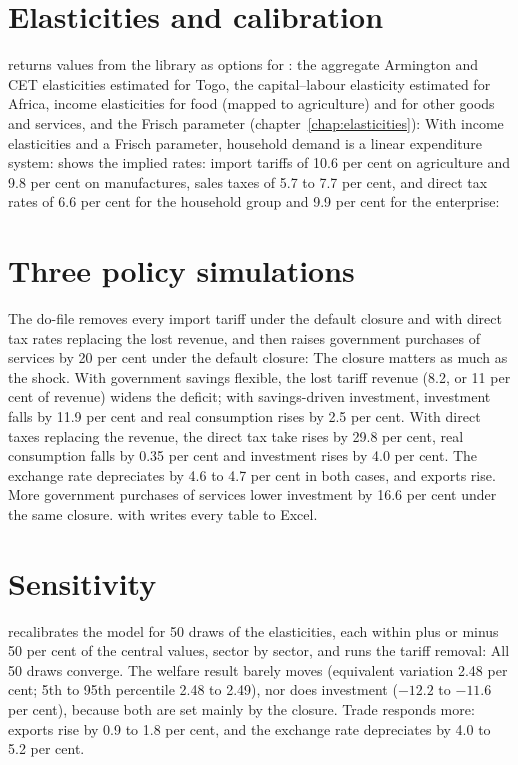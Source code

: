 \section{Elasticities and calibration}

 returns values from the library as options for
: the aggregate Armington and CET elasticities estimated
for Togo, the capital--labour elasticity estimated for Africa, income
elasticities for food (mapped to agriculture) and for other goods and
services, and the Frisch parameter (chapter~\ref{chap:elasticities}):
With income elasticities and a Frisch parameter, household demand is a linear
expenditure system:
 shows the implied rates: import tariffs of 10.6 per
cent on agriculture and 9.8 per cent on manufactures, sales taxes of 5.7 to 7.7
per cent, and direct tax rates of 6.6 per cent for the household group and 9.9
per cent for the enterprise:

\section{Three policy simulations}

The do-file removes every import tariff under the default closure and with
direct tax rates replacing the lost revenue, and then raises government
purchases of services by 20 per cent under the default closure:
The closure matters as much as the shock. With government savings flexible,
the lost tariff revenue (8.2, or 11 per cent of revenue) widens the deficit;
with savings-driven investment, investment falls by 11.9 per cent and real
consumption rises by 2.5 per cent. With direct taxes replacing the revenue,
the direct tax take rises by 29.8 per cent, real consumption falls by 0.35 per
cent and investment rises by 4.0 per cent. The exchange rate depreciates by 4.6
to 4.7 per cent in both cases, and exports rise. More government purchases of
services lower investment by 16.6 per cent under the same closure.
 with  writes every table to Excel.

\section{Sensitivity}

 recalibrates the model for 50 draws of the
elasticities, each within plus or minus 50 per cent of the central values,
sector by sector, and runs the tariff removal:
All 50 draws converge. The welfare result barely moves (equivalent variation
2.48 per cent; 5th to 95th percentile 2.48 to 2.49), nor does investment
($-12.2$ to $-11.6$ per cent), because both are set mainly by the closure.
Trade responds more: exports rise by 0.9 to 1.8 per cent, and the exchange rate
depreciates by 4.0 to 5.2 per cent.

